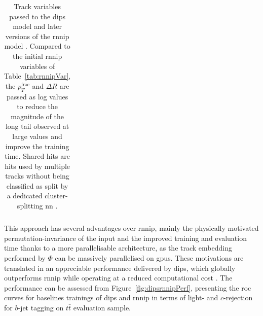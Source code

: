 \begin{table}[h]
\begin{center}
\begin{tabular}{C{3cm}|C{13cm}}
      \end{tabular}
      \caption{Track variables passed to the \gls{dips} model and later versions of the \gls{rnnip} model \cite{ATL-PHYS-PUB-2020-014}. Compared to the initial \gls{rnnip} variables of Table~\ref{tab:rnnipVar}, the $p_T^{\textrm{frac}}$ and $\Delta R$ are passed as log values to reduce the magnitude of the long tail observed at large values and improve the training time. Shared hits are hits used by multiple tracks without being classified as split by a dedicated cluster-splitting \gls{nn} \cite{ATLAS-tracks-algo}.}
    \label{tab:dipsVar}
  \end{center}
\end{table}

This approach has several advantages over \gls{rnnip}, mainly the physically motivated permutation-invariance of the input and the improved training and evaluation time thanks to a more parallelisable architecture, as the track embedding performed by $\Phi$ can be massively parallelised on \glspl{gpu}. These motivations are translated in an appreciable performance delivered by \gls{dips}, which globally outperforms \gls{rnnip} while operating at a reduced computational cost \cite{ATL-PHYS-PUB-2020-014}. The performance can be assessed from Figure~\ref{fig:dipsrnnipPerf}, presenting the \gls{roc} curves for baselines trainings of \gls{dips} and \gls{rnnip} in terms of light- and $c$-rejection for $b$-jet tagging on $t\bar{t}$ evaluation sample. \\

